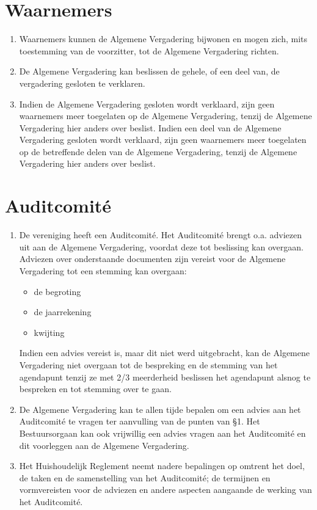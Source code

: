     \section{Waarnemers}
    \begin{enumerate}
    \item Waarnemers kunnen de Algemene Vergadering bijwonen en mogen zich, mits toestemming van de voorzitter, tot de Algemene Vergadering richten.
    \item De Algemene Vergadering kan beslissen de gehele, of een deel van, de vergadering gesloten te verklaren.
    \item Indien de Algemene Vergadering gesloten wordt verklaard, zijn geen waarnemers meer toegelaten op de Algemene Vergadering, tenzij de Algemene Vergadering hier anders over beslist. Indien een deel van de Algemene Vergadering gesloten wordt verklaard, zijn geen waarnemers meer toegelaten op de betreffende delen van de Algemene Vergadering, tenzij de Algemene Vergadering hier anders over beslist.
    \end{enumerate}
    
    \section{Auditcomité}\label{ArtikelAudit}
    \begin{enumerate}
    \item De vereniging heeft een Auditcomité. Het Auditcomité brengt o.a. adviezen uit aan de Algemene Vergadering, voordat deze tot beslissing kan overgaan. Adviezen over onderstaande documenten zijn vereist voor de Algemene Vergadering tot een stemming kan overgaan:
        \begin{itemize}
        \item de begroting
        \item de jaarrekening
        \item kwijting
        \end{itemize}
    Indien een advies vereist is, maar dit niet werd uitgebracht, kan de Algemene Vergadering niet overgaan tot de bespreking en de stemming van het agendapunt tenzij ze met 2/3 meerderheid beslissen het agendapunt alsnog te bespreken en tot stemming over te gaan.
    \item De Algemene Vergadering kan te allen tijde bepalen om een advies aan het Auditcomité te vragen ter aanvulling van de punten van §1. Het Bestuursorgaan kan ook vrijwillig een advies vragen aan het Auditcomité en dit voorleggen aan de Algemene Vergadering.
    \item Het Huishoudelijk Reglement neemt nadere bepalingen op omtrent het doel, de taken en de samenstelling van het Auditcomité; de termijnen en vormvereisten voor de adviezen en andere aspecten aangaande de werking van het Auditcomité.
    \end{enumerate}


